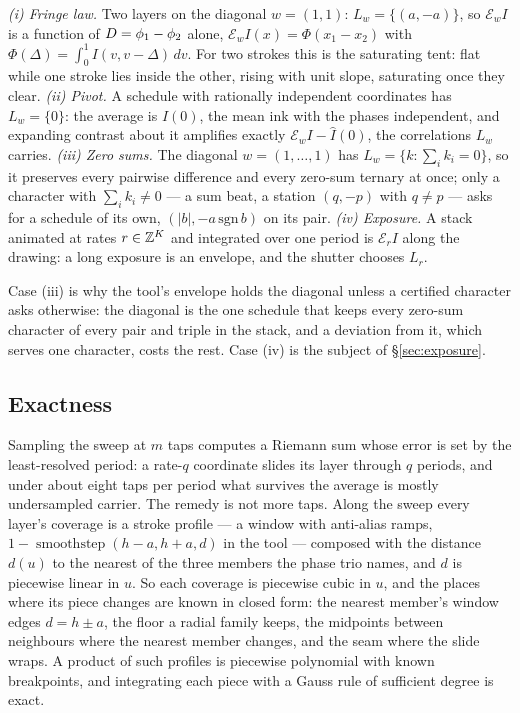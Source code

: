 \begin{corollary}
\label{cor:cases}
\emph{(i) Fringe law.} Two layers on the diagonal $w=(1,1)$: $L_w=\{(a,-a)\}$,
so $\mathcal E_wI$ is a function of $D=\phi_1-\phi_2$ alone,
$\mathcal E_wI(x)=\Phi(x_1-x_2)$ with $\Phi(\Delta)=\int_0^1 I(v,v-\Delta)\,dv$.
For two strokes this is the saturating tent: flat while one stroke lies inside
the other, rising with unit slope, saturating once they clear.
\emph{(ii) Pivot.} A schedule with rationally independent coordinates has
$L_w=\{0\}$: the average is $\hat I(0)$, the mean ink with the phases
independent, and expanding contrast about it amplifies exactly
$\mathcal E_wI-\hat I(0)$, the correlations $L_w$ carries.
\emph{(iii) Zero sums.} The diagonal $w=(1,\dots,1)$ has $L_w=\{k:\sum_i k_i=0\}$,
so it preserves every pairwise difference and every zero-sum ternary at once;
only a character with $\sum_i k_i\ne0$ --- a sum beat, a station $(q,-p)$ with
$q\ne p$ --- asks for a schedule of its own, $(|b|,-a\,\mathrm{sgn}\,b)$ on its
pair.
\emph{(iv) Exposure.} A stack animated at rates $r\in\mathbb{Z}^K$ and integrated over
one period is $\mathcal E_r I$ along the drawing: a long exposure is an
envelope, and the shutter chooses $L_r$.
\end{corollary}

Case (iii) is why the tool's envelope holds the diagonal unless a certified
character asks otherwise: the diagonal is the one schedule that keeps every
zero-sum character of every pair and triple in the stack, and a deviation from
it, which serves one character, costs the rest. Case (iv) is the subject of
\S\ref{sec:exposure}.

\subsection{Exactness}
\label{sec:exactness}

Sampling the sweep at $m$ taps computes a Riemann sum whose error is set by
the least-resolved period: a rate-$q$ coordinate slides its layer through $q$
periods, and under about eight taps per period what survives the average is
mostly undersampled carrier. The remedy is not more taps. Along the sweep
every layer's coverage is a stroke profile --- a window with anti-alias ramps,
$1-\operatorname{smoothstep}(h-a,h+a,d)$ in the tool --- composed with the
distance $d(u)$ to the nearest of the three members the phase trio names, and
$d$ is piecewise linear in $u$. So each coverage is piecewise cubic in $u$, and
the places where its piece changes are known in closed form: the nearest
member's window edges $d=h\pm a$, the floor a radial family keeps, the
midpoints between neighbours where the nearest member changes, and the seam
where the slide wraps. A product of such profiles is piecewise polynomial with
known breakpoints, and integrating each piece with a Gauss rule of sufficient
degree is exact.


